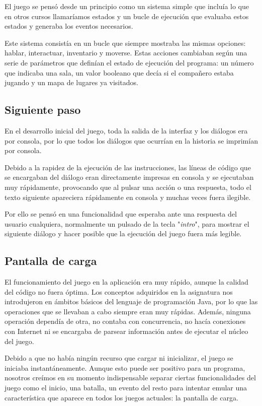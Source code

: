 El juego se pensó desde un principio como un sistema simple que incluía lo que en otros cursos llamaríamos estados  y un bucle de ejecución que evaluaba estos estados y generaba los eventos necesarios.

Este sistema consistía en un bucle que siempre mostraba las mismas opciones: hablar, interactuar, inventario y moverse. Estas acciones cambiaban según una serie de parámetros que definían el estado de ejecución del programa: un número que indicaba una sala, un valor booleano que decía si el compañero estaba jugando y un mapa de lugares ya visitados.

\subsection{Siguiente paso}

En el desarrollo inicial del juego, toda la salida de la interfaz y los diálogos era por consola, por lo que todos los diálogos que ocurrían en la historia se imprimían por consola.

Debido a la rapidez de la ejecución de las instrucciones, las líneas de código que se encargaban del diálogo eran directamente impresas en consola y se ejecutaban muy rápidamente, provocando que al pulsar una acción o una respuesta, todo el texto siguiente apareciera rápidamente en consola  y muchas veces fuera ilegible.

Por ello se pensó en una funcionalidad que esperaba ante una respuesta del usuario cualquiera, normalmente un pulsado de la tecla "\textit{intro}", para mostrar el siguiente diálogo y hacer posible que la ejecución del juego fuera más legible.

\subsection{Pantalla de carga}

El funcionamiento del juego en la aplicación era muy rápido, aunque la calidad del código no fuera óptima. Los conceptos adquiridos en la asignatura nos introdujeron en ámbitos básicos del lenguaje de programación Java, por lo que las operaciones que se llevaban a cabo siempre eran muy rápidas. Además, ninguna operación dependía de otra, no contaba con concurrencia, no hacía conexiones con Internet ni se encargaba de parsear  información antes de ejecutar el núcleo del juego.

Debido a que no había ningún recurso que cargar ni inicializar, el juego se iniciaba instantáneamente.
Aunque esto puede ser positivo para un programa, nosotros creímos en su momento indispensable separar ciertas funcionalidades del juego como el inicio, una batalla, un evento del resto para intentar emular una característica que aparece en todos los juegos actuales: la pantalla de carga.

